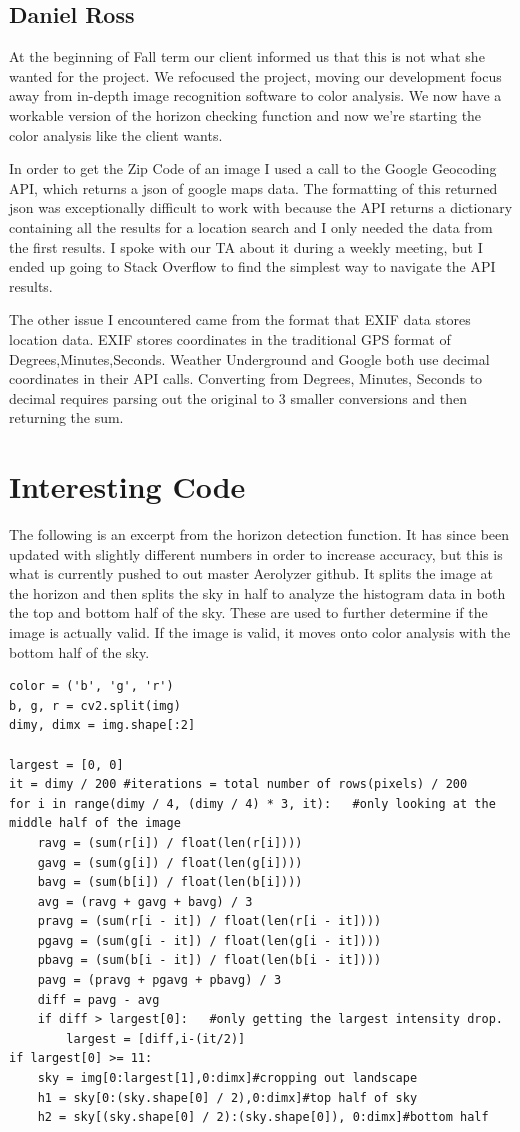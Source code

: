 \documentclass[onecolumn, draftclsnofoot,10pt, compsoc]{IEEEtran}
\begin{document}
\begin{singlespace}
		\subsection{Daniel Ross}
			At the beginning of Fall term our client informed us that this is not what she wanted for the project.
			We refocused the project, moving our development focus away from in-depth image recognition software to color analysis.
			We now have a workable version of the horizon checking function and now we're starting the color analysis like the client wants.

			In order to get the Zip Code of an image I used a call to the Google Geocoding API\cite{GoogleGeo}, which returns a json of google maps data.
			The formatting of this returned json was exceptionally difficult to work with because the API returns a dictionary containing all the results for a location search and I only needed the data from the first results.
			I spoke with our TA about it during a weekly meeting, but I ended up going to Stack Overflow to find the simplest way to navigate the API results.
			
			The other issue I encountered came from the format that EXIF data stores location data.
			EXIF stores coordinates in the traditional GPS format of Degrees,Minutes,Seconds.
			Weather Underground and Google both use decimal coordinates in their API calls.
			Converting from Degrees, Minutes, Seconds to decimal requires parsing out the original to 3 smaller conversions and then returning the sum.
	\section{Interesting Code}
		The following is an excerpt from the horizon detection function.
		It has since been updated with slightly different numbers in order to increase accuracy, but this is what is currently pushed to out master Aerolyzer github.
		It splits the image at the horizon and then splits the sky in half to analyze the histogram data in both the top and bottom half of the sky.
		These are used to further determine if the image is actually valid.
		If the image is valid, it moves onto color analysis with the bottom half of the sky.
		\begin{lstlisting}
color = ('b', 'g', 'r')
b, g, r = cv2.split(img)
dimy, dimx = img.shape[:2]

largest = [0, 0]
it = dimy / 200 #iterations = total number of rows(pixels) / 200
for i in range(dimy / 4, (dimy / 4) * 3, it):   #only looking at the middle half of the image
	ravg = (sum(r[i]) / float(len(r[i])))
	gavg = (sum(g[i]) / float(len(g[i])))
	bavg = (sum(b[i]) / float(len(b[i])))
	avg = (ravg + gavg + bavg) / 3
	pravg = (sum(r[i - it]) / float(len(r[i - it])))
	pgavg = (sum(g[i - it]) / float(len(g[i - it])))
	pbavg = (sum(b[i - it]) / float(len(b[i - it])))
	pavg = (pravg + pgavg + pbavg) / 3
	diff = pavg - avg
	if diff > largest[0]:   #only getting the largest intensity drop.
		largest = [diff,i-(it/2)]
if largest[0] >= 11:
	sky = img[0:largest[1],0:dimx]#cropping out landscape
	h1 = sky[0:(sky.shape[0] / 2),0:dimx]#top half of sky
	h2 = sky[(sky.shape[0] / 2):(sky.shape[0]), 0:dimx]#bottom half


\end{lstlisting}
\end{singlespace}
\end{document}
